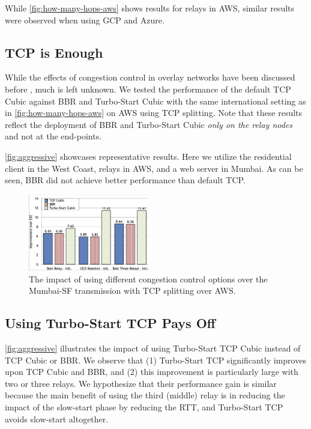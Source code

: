\documentclass[newfonts=false,format=sigconf,anonymous,10pt,letterpaper]{acmart}
\begin{document}
While \autoref{fig:how-many-hops-aws} shows results for relays in AWS, similar results were observed when using GCP and Azure.

\subsection{TCP is Enough} 
While the effects of congestion control in overlay networks have been discussed before \cite{CRONets}, much is left unknown.
We tested the performance of the default TCP Cubic against BBR and Turbo-Start Cubic with the same international setting as in \autoref{fig:how-many-hops-aws} on AWS using TCP splitting. Note that these results reflect the deployment of BBR and Turbo-Start Cubic \textit{only on the relay nodes} and not at the end-points.

\autoref{fig:aggressive}
showcases representative results. Here we utilize the residential client in the West Coast, relays in AWS, and a web server in Mumbai. As can be seen, BBR did not achieve better performance than default TCP.

\begin{figure}
  \centering
    \includegraphics[width=0.47\textwidth,trim=2mm 2mm 2mm 2mm,clip]{figures/aggressive.png}
    \caption{%
    The impact of using different congestion control options over the Mumbai-SF transmission with TCP splitting over AWS. %
   }
    \label{fig:aggressive}
\end{figure}

\subsection{Using Turbo-Start TCP Pays Off}\label{subsec:quick-start}
\autoref{fig:aggressive} illustrates the impact of using Turbo-Start TCP Cubic  instead of TCP Cubic or BBR.
We observe that (1) Turbo-Start TCP significantly improves upon TCP Cubic and BBR, and (2) this improvement is particularly large with two or three relays. We hypothesize that their performance gain is similar because the main benefit of using the third (middle) relay is in reducing the impact of the slow-start phase by reducing the RTT, and Turbo-Start TCP avoids slow-start altogether.
\end{document}
